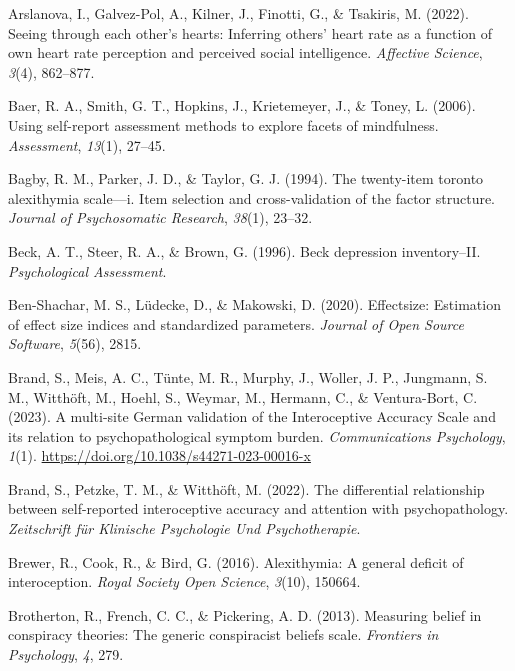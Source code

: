 \documentclass[
  man,
  floatsintext,
  longtable,
  nolmodern,
  notxfonts,
  notimes,
  colorlinks=true,linkcolor=blue,citecolor=blue,urlcolor=blue]{apa7}
\newlength{\cslhangindent}
\newenvironment{CSLReferences}[2] %
 {\begin{list}{}{%
  \setlength{\itemindent}{0pt}
  \setlength{\leftmargin}{0pt}
  \setlength{\parsep}{0pt}
  \ifodd #1
   \setlength{\leftmargin}{\cslhangindent}
   \setlength{\itemindent}{-1\cslhangindent}
  \fi
  \setlength{\itemsep}{#2\baselineskip}}}
 {\end{list}}
\begin{document}
\label{refs}
\begin{CSLReferences}{1}{0}
Arslanova, I., Galvez-Pol, A., Kilner, J., Finotti, G., \& Tsakiris, M.
(2022). Seeing through each other's hearts: Inferring others' heart rate
as a function of own heart rate perception and perceived social
intelligence. \emph{Affective Science}, \emph{3}(4), 862--877.

Baer, R. A., Smith, G. T., Hopkins, J., Krietemeyer, J., \& Toney, L.
(2006). Using self-report assessment methods to explore facets of
mindfulness. \emph{Assessment}, \emph{13}(1), 27--45.

Bagby, R. M., Parker, J. D., \& Taylor, G. J. (1994). The twenty-item
toronto alexithymia scale---i. Item selection and cross-validation of
the factor structure. \emph{Journal of Psychosomatic Research},
\emph{38}(1), 23--32.

Beck, A. T., Steer, R. A., \& Brown, G. (1996). Beck depression
inventory--II. \emph{Psychological Assessment}.

Ben-Shachar, M. S., Lüdecke, D., \& Makowski, D. (2020). Effectsize:
Estimation of effect size indices and standardized parameters.
\emph{Journal of Open Source Software}, \emph{5}(56), 2815.

Brand, S., Meis, A. C., Tünte, M. R., Murphy, J., Woller, J. P.,
Jungmann, S. M., Witthöft, M., Hoehl, S., Weymar, M., Hermann, C., \&
Ventura-Bort, C. (2023). A multi-site German validation of the
Interoceptive Accuracy Scale and its relation to psychopathological
symptom burden. \emph{Communications Psychology}, \emph{1}(1).
\url{https://doi.org/10.1038/s44271-023-00016-x}

Brand, S., Petzke, T. M., \& Witthöft, M. (2022). The differential
relationship between self-reported interoceptive accuracy and attention
with psychopathology. \emph{Zeitschrift f{ü}r Klinische Psychologie Und
Psychotherapie}.

Brewer, R., Cook, R., \& Bird, G. (2016). Alexithymia: A general deficit
of interoception. \emph{Royal Society Open Science}, \emph{3}(10),
150664.

Brotherton, R., French, C. C., \& Pickering, A. D. (2013). Measuring
belief in conspiracy theories: The generic conspiracist beliefs scale.
\emph{Frontiers in Psychology}, \emph{4}, 279.


\end{CSLReferences}
\end{document}
